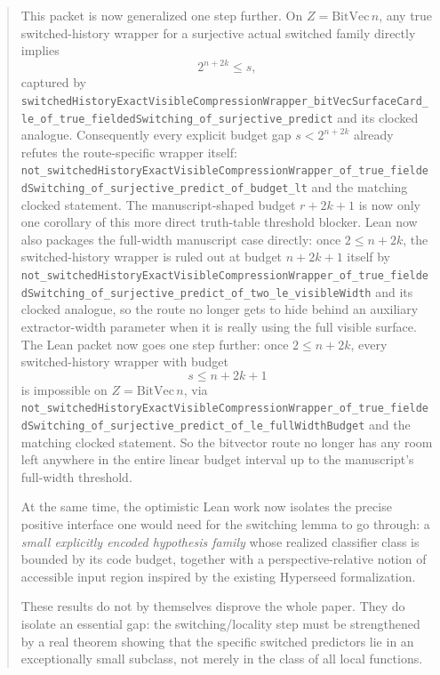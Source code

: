 \documentclass[11pt]{article}
\theoremstyle{remark}
\begin{document}
\begin{abstract}
This packet is now generalized one step further.  On \(Z = \mathrm{BitVec}\,n\),
any true switched-history wrapper for a surjective actual switched family
directly implies
\[
  2^{n+2k} \le s,
\]
captured by
\texttt{switchedHistoryExactVisibleCompressionWrapper\_bitVecSurfaceCard\_le\_of\_true\_fieldedSwitching\_of\_surjective\_predict}
and its clocked analogue.  Consequently every explicit budget gap
\(s < 2^{n+2k}\) already refutes the route-specific wrapper itself:
\texttt{not\_switchedHistoryExactVisibleCompressionWrapper\_of\_true\_fieldedSwitching\_of\_surjective\_predict\_of\_budget\_lt}
and the matching clocked statement.  The manuscript-shaped budget
\(r + 2k + 1\) is now only one corollary of this more direct truth-table
threshold blocker.  Lean now also packages the full-width manuscript case
directly: once \(2 \le n + 2k\), the switched-history wrapper is ruled out at
budget \(n + 2k + 1\) itself by
\texttt{not\_switchedHistoryExactVisibleCompressionWrapper\_of\_true\_fieldedSwitching\_of\_surjective\_predict\_of\_two\_le\_visibleWidth}
and its clocked analogue, so the route no longer gets to hide behind an
auxiliary extractor-width parameter when it is really using the full visible
surface.  The Lean packet now goes one step further: once \(2 \le n + 2k\),
every switched-history wrapper with budget
\[
  s \le n + 2k + 1
\]
is impossible on \(Z = \mathrm{BitVec}\,n\), via
\texttt{not\_switchedHistoryExactVisibleCompressionWrapper\_of\_true\_fieldedSwitching\_of\_surjective\_predict\_of\_le\_fullWidthBudget}
and the matching clocked statement.  So the bitvector route no longer has any
room left anywhere in the entire linear budget interval up to the manuscript's
full-width threshold.

At the same time, the optimistic Lean work now isolates the precise positive interface one
would need for the switching lemma to go through: a \emph{small explicitly encoded
hypothesis family} whose realized classifier class is bounded by its code budget, together
with a perspective-relative notion of accessible input region inspired by the existing
Hyperseed formalization.

These results do not by themselves disprove the whole paper.  They do isolate an essential gap:
the switching/locality step must be strengthened by a real theorem showing that the specific
switched predictors lie in an exceptionally small subclass, not merely in the class of all local
functions.
\end{abstract}

\tableofcontents
\end{document}
